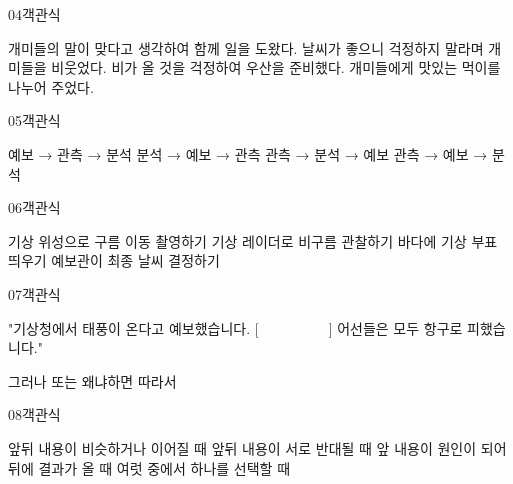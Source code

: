 \documentclass[fs11,seriesFre]{korfarm-base}
\begin{document}
\begin{kfQBlock}{04}{객관식}
\begin{kfChoices}
\kfChoice 개미들의 말이 맞다고 생각하여 함께 일을 도왔다.
\kfChoice 날씨가 좋으니 걱정하지 말라며 개미들을 비웃었다.
\kfChoice 비가 올 것을 걱정하여 우산을 준비했다.
\kfChoice 개미들에게 맛있는 먹이를 나누어 주었다.
\end{kfChoices}
\end{kfQBlock}

\begin{kfQBlock}{05}{객관식}
\begin{kfChoices}
\kfChoice 예보 → 관측 → 분석
\kfChoice 분석 → 예보 → 관측
\kfChoice 관측 → 분석 → 예보
\kfChoice 관측 → 예보 → 분석
\end{kfChoices}
\end{kfQBlock}

\begin{kfQBlock}{06}{객관식}
\begin{kfChoices}
\kfChoice 기상 위성으로 구름 이동 촬영하기
\kfChoice 기상 레이더로 비구름 관찰하기
\kfChoice 바다에 기상 부표 띄우기
\kfChoice 예보관이 최종 날씨 결정하기
\end{kfChoices}
\end{kfQBlock}

\begin{kfQBlock}{07}{객관식}
\begin{kfEvidence}"기상청에서 태풍이 온다고 예보했습니다. [　　　　　] 어선들은 모두 항구로 피했습니다."\end{kfEvidence}
\begin{kfChoices}
\kfChoice 그러나
\kfChoice 또는
\kfChoice 왜냐하면
\kfChoice 따라서
\end{kfChoices}
\end{kfQBlock}

\begin{kfQBlock}{08}{객관식}
\begin{kfChoices}
\kfChoice 앞뒤 내용이 비슷하거나 이어질 때
\kfChoice 앞뒤 내용이 서로 반대될 때
\kfChoice 앞 내용이 원인이 되어 뒤에 결과가 올 때
\kfChoice 여럿 중에서 하나를 선택할 때
\end{kfChoices}
\end{kfQBlock}
\end{document}
